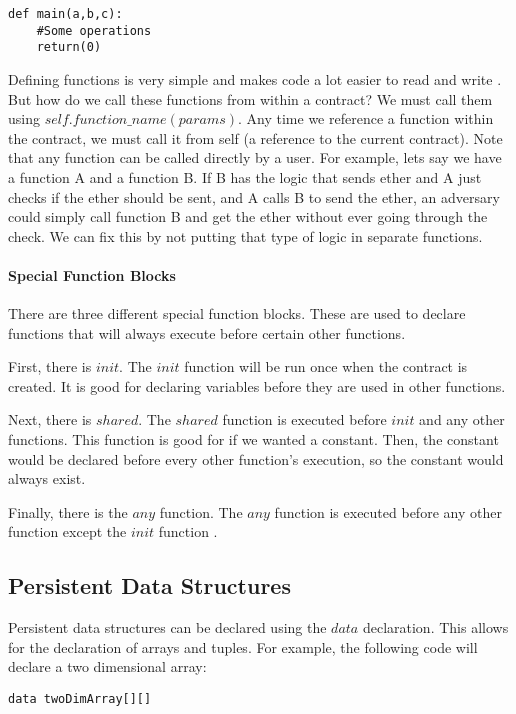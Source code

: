 \documentclass[12pt]{article}
\begin{document}
\begin{verbatim}
def main(a,b,c):
	#Some operations
	return(0)
\end{verbatim}

Defining functions is very simple and makes code a lot easier to read and write \cite{Serpent}. But how do we call these functions from within a contract? We must call them using $self.function\_name(params)$. Any time we reference a function within the contract, we must call it from self (a reference to the current contract). Note that any function can be called directly by a user. For example, lets say we have a function A and a function B. If B has the logic that sends ether and A just checks if the ether should be sent, and A calls B to send the ether, an adversary could simply call function B and get the ether without ever going through the check. We can fix this by not putting that type of logic in separate functions.

\paragraph{Special Function Blocks}
There are three different special function blocks. These are used to declare functions that will always execute before certain other functions.

First, there is $init$. The $init$ function will be run once when the contract is created. It is good for declaring variables before they are used in other functions.

Next, there is $shared$. The $shared$ function is executed before $init$ and any other functions. This function is good for if we wanted a constant. Then, the constant would be declared before every other function's execution, so the constant would always exist.

Finally, there is the $any$ function. The $any$ function is executed before any other function except the $init$ function \cite{Serpent}.

\subsection{Persistent Data Structures}

Persistent data structures can be declared using the $data$ declaration. This allows for the declaration of arrays and tuples. For example, the following code will declare a two dimensional array:

\begin{verbatim}
data twoDimArray[][]
\end{verbatim}
\end{document}
